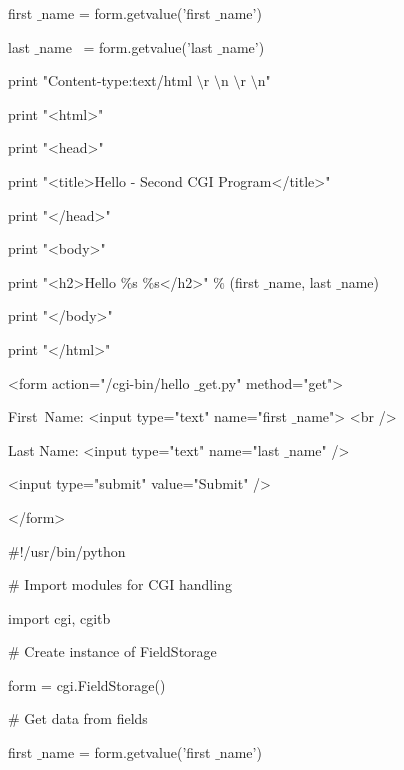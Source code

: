 \noindent 
first $  \_  $name = form.getvalue('first $  \_  $name') \par
\noindent 
last $  \_  $name~ = form.getvalue('last $  \_  $name') \par
\vspace{12pt}
\noindent 
print "Content-type:text/html $  \setminus  $r $  \setminus  $n $  \setminus  $r $  \setminus  $n" \par
\noindent 
print "<html>" \par
\noindent 
print "<head>" \par
\noindent 
print "<title>Hello - Second CGI Program</title>" \par
\noindent 
print "</head>" \par
\noindent 
print "<body>" \par
\noindent 
print "<h2>Hello  $  \%  $s  $  \%  $s</h2>"  $  \%  $ (first $  \_  $name, last $  \_  $name) \par
\noindent 
print "</body>" \par
\noindent 
print "</html>" \par
\vspace{12pt}
\noindent 
<form action="/cgi-bin/hello $  \_  $get.py" method="get"> \par
\noindent 
First~Name: <input type="text" name="first $  \_  $name">  <br /> \par
\vspace{12pt}
\noindent 
Last Name: <input type="text" name="last $  \_  $name" /> \par
\noindent 
<input type="submit" value="Submit" /> \par
\noindent 
</form> \par
\vspace{12pt}
\noindent 
 $  \#  $!/usr/bin/python \par
\vspace{12pt}
\noindent 
 $  \#  $ Import modules for CGI handling  \par
\noindent 
import cgi, cgitb  \par
\vspace{12pt}
\noindent 
 $  \#  $ Create instance of FieldStorage  \par
\noindent 
form = cgi.FieldStorage()  \par
\vspace{12pt}
\noindent 
 $  \#  $ Get data from fields \par
\noindent 
first $  \_  $name = form.getvalue('first $  \_  $name') \par
\noindent 
